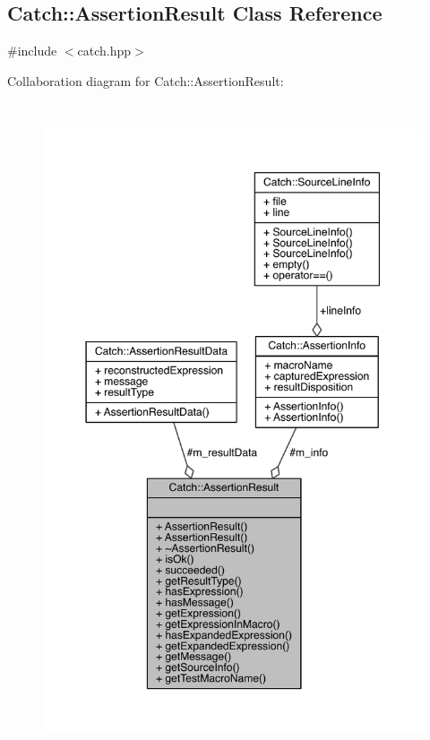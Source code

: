 \hypertarget{a00005}{}\subsection{Catch\+:\+:Assertion\+Result Class Reference}
\label{a00005}


{\ttfamily \#include $<$catch.\+hpp$>$}



Collaboration diagram for Catch\+:\+:Assertion\+Result\+:\nopagebreak
\begin{figure}[H]
\begin{center}
\leavevmode
\includegraphics[height=550pt]{a00172}
\end{center}
\end{figure}
